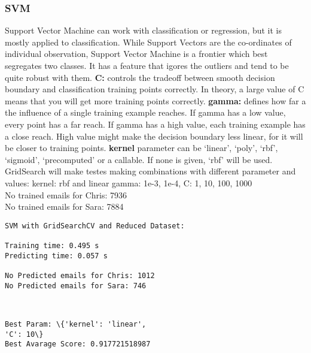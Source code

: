 \documentclass[11pt]{article}
\begin{document}
\begin{multicols}{2}
    \subsubsection{SVM}\label{svm}

Support Vector Machine can work with classification or regression, but
it is mostly applied to classification. While Support Vectors are the
co-ordinates of individual observation, Support Vector Machine is a
frontier which best segregates two classes. It has a feature that igores
the outliers and tend to be quite robust with them. \textbf{C:} controls
the tradeoff between smooth decision boundary and classification
training points correctly. In theory, a large value of C means that you
will get more training points correctly. \textbf{gamma:} defines how far
a the influence of a single training example reaches. If gamma has a low
value, every point has a far reach. If gamma has a high value, each
training example has a close reach. High value might make the decision
boundary less linear, for it will be closer to training points.
\textbf{kernel} parameter can be `linear', `poly', `rbf', `sigmoid',
`precomputed' or a callable. If none is given, `rbf' will be used.
GridSearch will make testes making combinations with different parameter
and values: kernel: rbf and linear gamma: 1e-3, 1e-4, C: 1, 10, 100,
1000\\

    

No trained emails for Chris: 7936\\
No trained emails for Sara: 7884
\begin{Verbatim}[commandchars=\\\{\}]
SVM with GridSearchCV and Reduced Dataset: 

Training time: 0.495 s 
Predicting time: 0.057 s

No Predicted emails for Chris: 1012 
No Predicted emails for Sara: 746

    \end{Verbatim}

    \begin{center}
    \end{center}
    { \hspace*{\fill} \\}
    
    \begin{Verbatim}[commandchars=\\\{\}]
Best Param: \{'kernel': 'linear', 
'C': 10\}
Best Avarage Score: 0.917721518987


\end{Verbatim}
\end{multicols}
\end{document}
